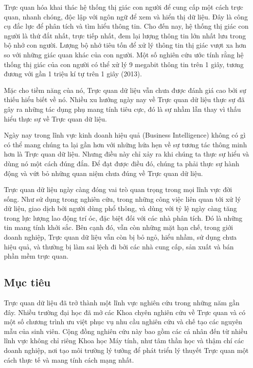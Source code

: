 \documentclass[12pt,a4paper]{article}
\begin{document}
Trực quan hóa khai thác hệ thống thị giác con người để cung cấp một cách trực quan, nhanh chóng, độc lập với ngôn ngữ để xem và hiển thị dữ liệu. Đây là công cụ đắc lực để phân tích và tìm hiểu thông tin. Cho đến nay, hệ thống thị giác con người là thứ đắt nhất, trực tiếp nhất, đem lại lượng thông tin lớn nhất lưu trong bộ nhớ con người. Lượng bộ nhớ tiêu tốn để xử lý thông tin thị giác vượt xa hơn so với những giác quan khác của con người. Một số nghiên cứu ước tính rằng hệ thống thị giác của con người có thể xử lý 9 megabit thông tin trên 1 giây, tương đương với gần 1 triệu kí tự trên 1 giây (2013)\cite{bigdata}.

Mặc cho tiềm năng của nó, Trực quan dữ liệu vẫn chưa được đánh giá cao bởi sự thiếu hiểu biết về nó. Nhiều xu hướng ngày nay về Trực quan dữ liệu thực sự đã gây ra những tác dụng phụ mang tính tiêu cực, đó là sự nhầm lẫn thay vì thấu hiểu thực sự về Trực quan dữ liệu. 

Ngày nay trong lĩnh vực kinh doanh hiệu quả (Business Intelligence) không có gì có thể mang chúng ta lại gần hơn với những hứa hẹn về sự tương tác thông minh hơn là Trực quan dữ liệu. Nhưng điều này chỉ xảy ra khi chúng ta thực sự hiểu và dùng nó một cách đúng đắn. Để đạt được điều đó, chúng ta phải thực sự hành động và vứt bỏ những quan niệm chưa đúng về Trực quan dữ liệu.

Trực quan dữ liệu ngày càng đóng vai trò quan trọng trong mọi lĩnh vực đời sống. Như sử dụng trong nghiên cứu, trong những công việc liên quan tới xử lý dữ liệu, giao dịch bởi người dùng phổ thông, và dùng với tỷ lệ ngày càng tăng trong lực lượng lao động trí óc, đặc biệt đối với các nhà phân tích. Đó là những tin mang tính khởi sắc. Bên cạnh đó, vẫn còn những mặt hạn chế, trong giới doanh nghiệp, Trực quan dữ liệu vẫn còn bị bỏ ngỏ, hiểu nhầm, sử dụng chưa hiệu quả, và thường bị làm sai lệch đi bởi các nhà cung cấp, sản xuất và bán phần mềm trực quan. 

\subsection{Mục tiêu}
Trực quan dữ liệu đã trở thành một lĩnh vực nghiên cứu trong những năm gần đây. Nhiều trường đại học đã mở các Khoa chyên nghiên cứu về Trực quan và có một số chương trình ưu việt phục vụ nhu cầu nghiên cứu và chế tạo các nguyên mẫu của sinh viên. Cộng đồng nghiên cứu này bao gồm các cá nhân đến từ nhiều lĩnh vực không chỉ riêng Khoa học Máy tính, như tâm thần học và thậm chí các doanh nghiệp, nơi tạo môi trường lý tưởng để phát triển lý thuyết Trực quan một cách thực tế và mang tính cách mạng nhất.
\end{document}
